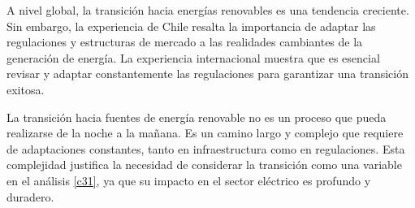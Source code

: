 A nivel global, la transición hacia energías renovables es una tendencia creciente. Sin embargo, la experiencia de Chile resalta la importancia de adaptar las regulaciones y estructuras de mercado a las realidades cambiantes de la generación de energía. La experiencia internacional muestra que es esencial revisar y adaptar constantemente las regulaciones para garantizar una transición exitosa.\vspace{2.5mm}

La transición hacia fuentes de energía renovable no es un proceso que pueda realizarse de la noche a la mañana. Es un camino largo y complejo que requiere de adaptaciones constantes, tanto en infraestructura como en regulaciones. Esta complejidad justifica la necesidad de considerar la transición como una variable en el análisis \ref{c31}, ya que su impacto en el sector eléctrico es profundo y duradero.

